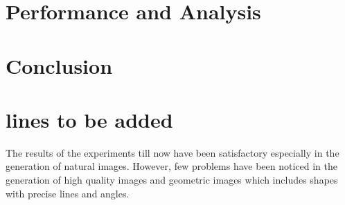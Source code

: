 \documentclass{article}
\begin{document}
\section{Performance and Analysis}

 
\section{Conclusion}



\section{lines to be added}
The results of the experiments till now have been satisfactory especially in the generation of natural images. However, few problems have been noticed in the generation of high quality images and geometric images which includes shapes with precise lines and angles.
\end{document}
